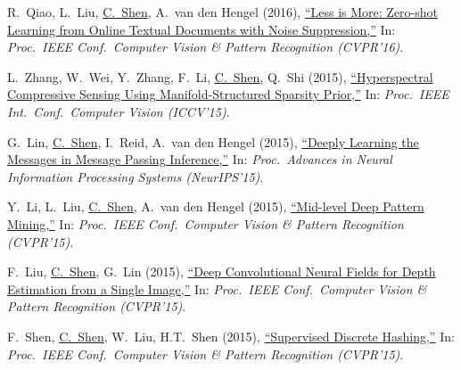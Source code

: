 \documentclass[9pt, a4paper]{article}
\newcommand{\years}[1]{\marginnote{\scriptsize #1}}
\def\highlight{\uline}
\begin{document}
\medskip

\years{2016} R.~Qiao, L.~Liu, \highlight{C.~Shen}, A.~van den Hengel (2016),
\href{http://www.google.com/search?lr=&ie=UTF-8&oe=UTF-8&q=Less+is+More%3A+Zero-shot+Learning+from+Online+Textual+Documents+with+Noise+Suppression+Ruizhi+Qiao%2C+Lingqiao+Liu%2C+Chunhua+Shen%2C+Anton+van+den+Hengel}{``Less is More: Zero-shot Learning from Online Textual Documents with Noise Suppression,{}''}
In: \emph{Proc.\ IEEE Conf.\  Computer Vision \& Pattern Recognition (CVPR'16)}.

\medskip

\years{2015} L.~Zhang, W.~Wei, Y.~Zhang, F.~Li, \highlight{C.~Shen}, Q.~Shi (2015),
\href{http://www.google.com/search?lr=&ie=UTF-8&oe=UTF-8&q=Hyperspectral+Compressive+Sensing+Using+Manifold-Structured+Sparsity+Prior+Lei+Zhang%2C+Wei+Wei%2C+Yanning++Zhang%2C+Fei+Li%2C+Chunhua+Shen%2C+Qinfeng+Shi}{``Hyperspectral Compressive Sensing Using Manifold-Structured Sparsity Prior,{}''}
In: \emph{Proc.\ IEEE Int.\ Conf.\  Computer Vision (ICCV'15)}.

\medskip

\years{2015} G.~Lin, \highlight{C.~Shen}, I.~Reid, A.~van den Hengel (2015),
\href{http://www.google.com/search?lr=&ie=UTF-8&oe=UTF-8&q=Deeply+Learning+the+Messages+in+Message+Passing+Inference+Guosheng+Lin%2C+Chunhua+Shen%2C+Ian+Reid%2C+Anton+van+den+Hengel}{``Deeply Learning the Messages in Message Passing Inference,{}''}
In: \emph{Proc.\ Advances in Neural Information Processing Systems (NeurIPS'15)}.

\medskip

\years{2015} Y.~Li, L.~Liu, \highlight{C.~Shen}, A.~van den Hengel (2015),
\href{http://www.google.com/search?lr=&ie=UTF-8&oe=UTF-8&q=Mid-level+Deep+Pattern+Mining+Yao+Li%2C+Lingqiao+Liu%2C+Chunhua+Shen%2C+Anton++van+den+Hengel}{``Mid-level Deep Pattern Mining,{}''}
In: \emph{Proc.\ IEEE Conf.\  Computer Vision \& Pattern Recognition (CVPR'15)}.

\medskip

\years{2015} F.~Liu, \highlight{C.~Shen}, G.~Lin (2015),
\href{http://www.google.com/search?lr=&ie=UTF-8&oe=UTF-8&q=Deep+Convolutional+Neural+Fields+for+Depth+Estimation+from+a+Single+Image+Fayao+Liu%2C+Chunhua+Shen%2C+Guosheng+Lin}{``Deep Convolutional Neural Fields for Depth Estimation from a Single Image,{}''}
In: \emph{Proc.\ IEEE Conf.\  Computer Vision \& Pattern Recognition (CVPR'15)}.

\medskip

\years{2015} F.~Shen, \highlight{C.~Shen}, W.~Liu, H.T.~Shen (2015),
\href{http://www.google.com/search?lr=&ie=UTF-8&oe=UTF-8&q=Supervised+Discrete+Hashing+Fumin+Shen%2C+Chunhua+Shen%2C+Wei+Liu%2C+Heng+Tao+Shen}{``Supervised Discrete Hashing,{}''}
In: \emph{Proc.\ IEEE Conf.\  Computer Vision \& Pattern Recognition (CVPR'15)}.
\end{document}
